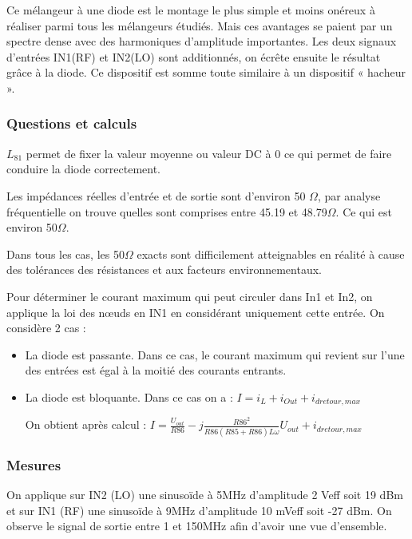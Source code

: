 \documentclass{article}
\begin{document}
Ce mélangeur à une diode est le montage le plus simple  et moins onéreux à réaliser parmi tous les mélangeurs étudiés. Mais ces avantages se paient par un spectre dense avec des harmoniques d'amplitude importantes.
Les deux signaux d'entrées IN1(RF) et IN2(LO) sont additionnés, on écrête ensuite le résultat grâce à la diode.
Ce dispositif est somme toute similaire à un dispositif « hacheur ».

\subsubsection{Questions et calculs}


$L_{81}$ permet de fixer la valeur moyenne ou valeur DC à 0 ce qui permet de faire conduire la diode correctement.


Les impédances réelles d'entrée et de sortie sont d'environ 50 $\Omega$, par analyse fréquentielle on trouve quelles sont comprises entre 45.19 et 48.79$\Omega$. Ce qui est environ 50$\Omega$.

Dans tous les cas, les 50$\Omega$ exacts sont difficilement atteignables en réalité à cause des tolérances des résistances et aux facteurs environnementaux.


Pour déterminer le courant maximum qui peut circuler dans In1 et In2, on applique la loi des nœuds en IN1 en considérant uniquement cette entrée.
On considère 2 cas :
\begin{itemize}
\item La diode est passante. Dans ce cas, le courant maximum qui revient sur l'une des entrées est égal à la moitié des courants entrants.

\item La diode est bloquante. Dans ce cas on a :
$I=i_{L}+i_{Out}+i_{dretour,max}$

On obtient après calcul :
$I=\frac{U_{out}}{R86}-j\frac{R86^2}{R86(R85+R86)L\omega}U_{out}+i_{dretour,max}$

\end{itemize}

\subsubsection{Mesures}


On applique sur IN2 (LO) une sinusoïde à 5MHz d'amplitude  2 Veff soit 19 dBm et sur IN1 (RF) une sinusoïde à 9MHz d'amplitude 10 mVeff soit -27 dBm.
On observe le signal de sortie entre 1 et 150MHz afin d'avoir une vue d'ensemble.
\end{document}
